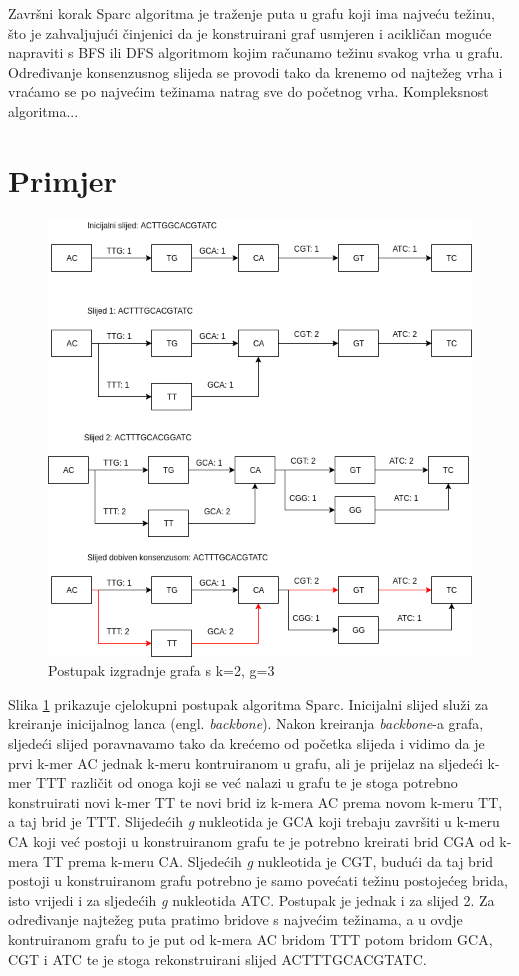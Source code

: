 \documentclass[times, utf8, seminar, numeric]{fer}
\begin{document}
Završni korak Sparc algoritma je traženje puta u grafu koji ima najveću težinu, što je zahvaljujući činjenici da je konstruirani graf usmjeren i acikličan moguće napraviti s BFS ili DFS algoritmom kojim računamo težinu svakog vrha u grafu. Određivanje konsenzusnog slijeda se provodi tako da krenemo od najtežeg vrha i vraćamo se po najvećim težinama natrag sve do početnog vrha. Kompleksnost algoritma...

\section{Primjer}
\begin{figure}[htb]
	\centering
	\includegraphics[scale=0.6]{images/backbone.png}
	\caption{Postupak izgradnje grafa s k=2, g=3}
	\label{picture:example}
\end{figure}

Slika \ref{picture:example} prikazuje cjelokupni postupak algoritma Sparc. Inicijalni slijed služi za kreiranje inicijalnog lanca (engl. \emph{backbone}). Nakon kreiranja \emph{backbone}-a grafa, sljedeći slijed poravnavamo tako da krećemo od početka slijeda i vidimo da je prvi k-mer AC jednak k-meru kontruiranom u grafu, ali je prijelaz na sljedeći k-mer TTT različit od onoga koji se već nalazi u grafu te je stoga potrebno konstruirati novi k-mer TT te novi brid iz k-mera AC prema novom k-meru TT, a taj brid je TTT. Slijedećih \emph{g} nukleotida je GCA koji trebaju završiti u k-meru CA koji već postoji u konstruiranom grafu te je potrebno kreirati brid CGA od k-mera TT prema k-meru CA. Sljedećih \emph{g} nukleotida je CGT, budući da taj brid postoji u konstruiranom grafu potrebno je samo povećati težinu postojećeg brida, isto vrijedi i za sljedećih \emph{g} nukleotida ATC. Postupak je jednak i za slijed 2. Za određivanje najtežeg puta pratimo bridove s najvećim težinama, a u ovdje kontruiranom grafu to je put od k-mera AC bridom TTT potom bridom GCA, CGT i ATC te je stoga rekonstruirani slijed ACTTTGCACGTATC.
\end{document}
